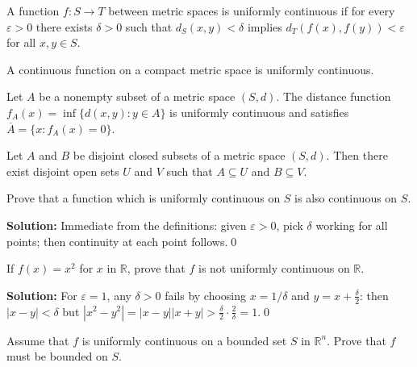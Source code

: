 \begin{definition}
A function $f: S \to T$ between metric spaces is uniformly continuous if for every $\varepsilon > 0$ there exists $\delta > 0$ such that $d_S(x,y) < \delta$ implies $d_T(f(x), f(y)) < \varepsilon$ for all $x,y \in S$.
\end{definition}

\begin{theorem}
A continuous function on a compact metric space is uniformly continuous.
\end{theorem}

\begin{theorem}
Let $A$ be a nonempty subset of a metric space $(S,d)$. The distance function $f_A(x) = \inf\{d(x,y) : y \in A\}$ is uniformly continuous and satisfies $\overline{A} = \{x : f_A(x) = 0\}$.
\end{theorem}

\begin{theorem}
Let $A$ and $B$ be disjoint closed subsets of a metric space $(S,d)$. Then there exist disjoint open sets $U$ and $V$ such that $A \subseteq U$ and $B \subseteq V$.
\end{theorem}



\begin{problembox}
Prove that a function which is uniformly continuous on $S$ is also continuous on $S$.
\end{problembox}

\noindent\textbf{Solution:}
Immediate from the definitions: given $\varepsilon>0$, pick $\delta$ working for all points; then continuity at each point follows.\qed



\begin{problembox}
If $f(x) = x^2$ for $x$ in $\mathbb{R}$, prove that $f$ is not uniformly continuous on $\mathbb{R}$.
\end{problembox}

\noindent\textbf{Solution:}
For $\varepsilon=1$, any $\delta>0$ fails by choosing $x=1/\delta$ and $y=x+\tfrac{\delta}{2}$: then $|x-y|<\delta$ but $|x^2-y^2|=|x-y||x+y|>\tfrac{\delta}{2}\cdot\tfrac{2}{\delta}=1$.\qed



\begin{problembox}
Assume that $f$ is uniformly continuous on a bounded set $S$ in $\mathbb{R}^n$. Prove that $f$ must be bounded on $S$.
\end{problembox}

